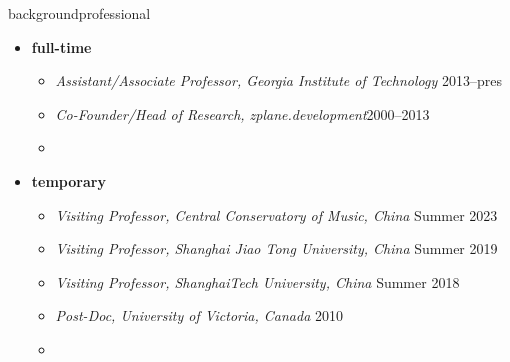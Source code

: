         \begin{frame}{background}{professional}
                   
            \begin{itemize}
                \item \textbf{full-time}
                    \begin{itemize}
                        \item   \textit{Assistant/Associate Professor, Georgia Institute of Technology}  \hfill{2013--pres}
                        \smallskip
                        \item   \textit{Co-Founder/Head of Research, zplane.development}\hfill 2000--2013
												\smallskip
                        \item[] \phantom{dummy \hfill 2000}
                    \end{itemize}
            \bigskip
                 \item \textbf{temporary}
                    \begin{itemize}
                        \item   \textit{Visiting Professor, Central Conservatory of Music, China}  \hfill{Summer 2023}
                        \smallskip
                        \item   \textit{Visiting Professor, Shanghai Jiao Tong University, China}  \hfill{Summer 2019}
                        \smallskip
                        \item   \textit{Visiting Professor, ShanghaiTech University, China} \hfill Summer 2018
                        \smallskip
                        \item   \textit{Post-Doc, University of Victoria, Canada} \hfill 2010
												\smallskip
                        \item[] \phantom{dummy \hfill 2000}
                    \end{itemize}
           \end{itemize}
        \end{frame}

        
